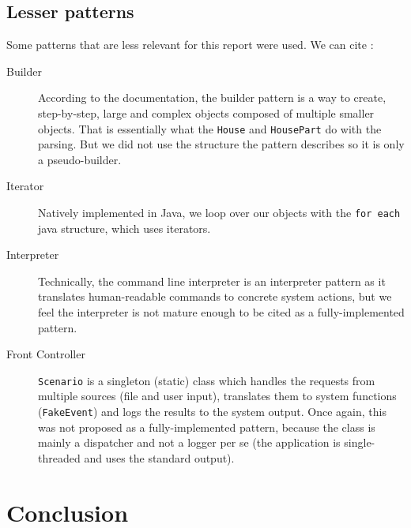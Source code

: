       \subsection{Lesser patterns}
        Some patterns that are less relevant for this report were used. We can cite :
        \begin{description}
          \item [Builder] According to the documentation, the builder pattern is a way to create, step-by-step, large and complex objects composed of multiple smaller objects. That is essentially what the \texttt{House} and \texttt{HousePart} do with the parsing. But we did not use the structure the pattern describes so it is only a pseudo-builder.
          \item [Iterator] Natively implemented in Java, we loop over our objects with the \texttt{for each} java structure, which uses iterators.
          \item [Interpreter] Technically, the command line interpreter is an interpreter pattern as it translates human-readable commands to concrete system actions, but we feel the interpreter is not mature enough to be cited as a fully-implemented pattern.
          \item [Front Controller] \texttt{Scenario} is a singleton (static) class which handles the requests from multiple sources (file and user input), translates them to system functions (\texttt{FakeEvent}) and logs the results to the system output. Once again, this was not proposed as a fully-implemented pattern, because the class is mainly a dispatcher and not a logger per se (the application is single-threaded and uses the standard output).
        \end{description}
	\section{Conclusion}


